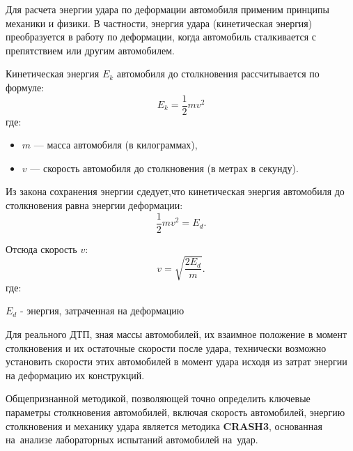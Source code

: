 Для расчета энергии удара по деформации автомобиля применим   принципы механики и физики. В частности, энергия удара (кинетическая энергия) преобразуется в работу по деформации, когда автомобиль сталкивается с препятствием или другим автомобилем.

%
Кинетическая энергия \( E_k \) автомобиля до столкновения рассчитывается по формуле:
\[
E_k = \frac{1}{2} m v^2
\]
где:

\begin{itemize}
	\item \( m \) — масса автомобиля (в килограммах),
	\item \( v \) — скорость автомобиля до столкновения (в метрах в секунду).
\end{itemize}


 Из закона сохранения энергии сдедует,что кинетическая энергия автомобиля до столкновения равна энергии деформации:
{\large 	\[
	\frac{1}{2} m v^2 = E_d.
	\]}

Отсюда скорость \( v \):
{\large 	\[
	v = \sqrt{\frac{2 E_d}{m}}.
	\]}
где:

${E_d}$ - энергия, затраченная на деформацию

Для реального ДТП, зная    массы автомобилей, их взаимное положение в момент столкновения и их
остаточные скорости после удара, технически возможно установить скорости    этих автомобилей в момент удара исходя из затрат энергии на деформацию их    конструкций.  

Общепризнанной методикой, позволяющей точно определить ключевые параметры столкновения автомобилей, включая скорость автомобилей, энергию столкновения и механику удара является методика \textbf{CRASH3},  
основанная на анализе лабораторных испытаний автомобилей на удар.

